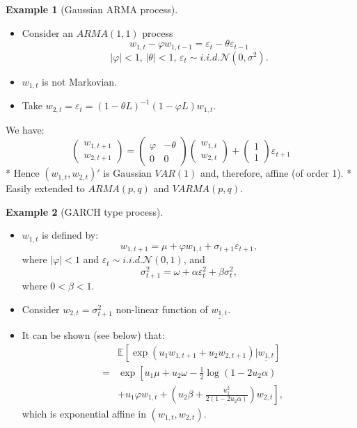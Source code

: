 \documentclass[
  12pt,
]{book}
\providecommand{\tightlist}{%
  \setlength{\itemsep}{0pt}\setlength{\parskip}{0pt}}
\theoremstyle{definition}
\theoremstyle{definition}
\newtheorem{example}{Example}[chapter]
\theoremstyle{definition}
\theoremstyle{definition}
\theoremstyle{remark}
\begin{document}
\begin{example}[Gaussian ARMA process]
\protect\hypertarget{exm:GaussianARMA}{}\label{exm:GaussianARMA}\leavevmode

\begin{itemize}
\tightlist
\item
  Consider an \(ARMA(1,1)\) process
  \[
  w_{1,t} - \varphi w_{1,t-1} = \varepsilon_t-\theta \varepsilon_{t-1}
  \]
  \[
  \mbox{$|\varphi | < 1$, $|\theta| < 1$, $\varepsilon_t \sim   i.i.d.  \mathcal{N}(0, \sigma^2)$}.
  \]
\item
  \(w_{1,t}\) is not Markovian.
\item
  Take \(w_{2,t} = \varepsilon_t = (1-\theta L)^{-1}(1-\varphi L)w_{1,t}\).
\end{itemize}

We have:
\[
\left(
\begin{array}{l}
w_{1,t+1} \\
w_{2,t+1}
\end{array}
\right) =
\left(
\begin{array}{ll}
\varphi & -\theta \\
0 &      0
\end{array}
\right)
\left(
\begin{array}{l}
w_{1,t} \\
w_{2,t}
\end{array}
\right) +
\left(
\begin{array}{l}
1 \\
1
\end{array}
\right) \varepsilon_{t+1}
\]
* Hence \((w_{1,t}, w_{2,t})'\) is Gaussian \(VAR(1)\)
and, therefore, affine (of order 1).
* Easily extended to \(ARMA(p,q)\) and \(VARMA(p,q).\)

\end{example}

\begin{example}[GARCH type process]
\protect\hypertarget{exm:GARCH}{}\label{exm:GARCH}\leavevmode

\begin{itemize}
\item
  \(w_{1,t}\) is defined by:
  \[
  w_{1,t+1}  = \mu + \varphi w_{1,t} + \sigma_{t+1} \varepsilon_{t+1},
  \]
  where \(|\varphi| < 1\) and \(\varepsilon_t \sim i.i.d. \mathcal{N}(0,1)\), and
  \[
  \sigma^2_{t+1} = \omega + \alpha \varepsilon^2_t + \beta \sigma^2_t,
  \]
  where \(0 < \beta < 1\).
\item
  Consider \(w_{2,t} = \sigma^2_{t+1}\) non-linear function of \(\underline{w_{1,t}}\).
\item
  It can be shown (see below) that:
  \begin{eqnarray*}
  && \mathbb{E}\left[\exp(u_1 w_{1,t+1} + u_2 w_{2,t+1})|\underline{w_{1,t}}\right] \\
  &=& \exp\left[u_1 \mu + u_2 \omega - \frac{1}{2}   \log(1-2 u_2 \alpha) \right. \\
  &&\left. +  u_1 \varphi w_{1,t} + (u_2\beta +  \frac{u^2_1}{2(1-2u_2\alpha)}) w_{2,t}\right],
  \end{eqnarray*}
  which is exponential affine in \((w_{1,t}, w_{2,t})\).
\end{itemize}

\end{example}
\end{document}

